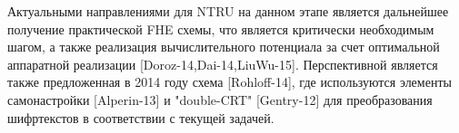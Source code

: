     Актуальными направлениями для NTRU на данном этапе является дальнейшее получение практической FHE схемы, что является критически необходимым шагом, а также реализация вычислительного потенциала за счет оптимальной аппаратной реализации [Doroz-14,Dai-14,LiuWu-15]. Перспективной является также предложенная в 2014 году схема [Rohloff-14], где используются элементы самонастройки [Alperin-13] и "double-CRT" [Gentry-12] для преобразования шифртекстов в соответствии с текущей задачей.\par
\normalcolor
